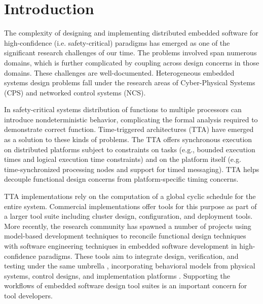 \newpage
\section{Introduction}
\label{introduction}


The complexity of designing and implementing distributed embedded software for high-confidence (i.e. safety-critical) paradigms has emerged as one of the significant research challenges of our time.   The problems involved span numerous domains, which is further complicated by coupling across design concerns in those domains.  These challenges are well-documented\cite{prog:embsys,modeling:platform}.  Heterogeneous embedded systems design problems fall under the research areas of Cyber-Physical Systems (CPS) and networked control systems (NCS).

In safety-critical systems distribution of functions to multiple processors can introduce nondeterministic behavior, complicating the formal analysis required to demonstrate correct function.  Time-triggered architectures\cite{timed:tta} (TTA) have emerged as a solution to these kinds of problems.  The TTA offers synchronous execution on distributed platforms subject to constraints on tasks (e.g., bounded execution times and logical execution time constraints) and on the platform itself (e.g. time-synchronized processing nodes and support for timed messaging).  TTA helps decouple functional design concerns from platform-specific timing concerns.

TTA implementations rely on the computation of a global cyclic schedule for the entire system.  Commercial implementations offer tools for this purpose\cite{tools:tttech} as part of a larger tool suite including cluster design, configuration, and deployment tools.  More recently, the research community has spawned a number of projects using model-based development techniques to reconcile functional design techniques with software engineering techniques in embedded software development in high-confidence paradigms.  These tools aim to integrate design, verification, and testing under the same umbrella \cite{modeling:metropolis,modeling:aadl_control_systems,modeling:aces08}, incorporating behavioral models from physical systems, control designs, and implementation platforms \cite{tools:truetime,tools:ptolemy2}.  Supporting the workflows of embedded software design tool suites is an important concern for tool developers.


